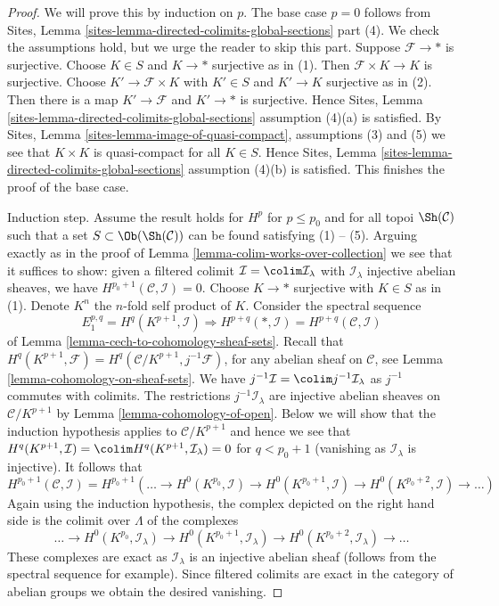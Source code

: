 \begin{proof}
We will prove this by induction on $p$. The base case $p = 0$
follows from
Sites, Lemma \ref{sites-lemma-directed-colimits-global-sections} part (4).
We check the assumptions hold, but we urge the reader to skip this part.
Suppose $\mathcal{F} \to *$ is surjective.
Choose $K \in S$ and $K \to *$ surjective as in (1). Then
$\mathcal{F} \times K \to K$ is surjective. Choose
$K' \to \mathcal{F} \times K$ with $K' \in S$ and $K' \to K$
surjective as in (2).
Then there is a map $K' \to \mathcal{F}$ and $K' \to *$ is surjective.
Hence 
Sites, Lemma \ref{sites-lemma-directed-colimits-global-sections}
assumption (4)(a) is satisfied.
By Sites, Lemma \ref{sites-lemma-image-of-quasi-compact}, assumptions
(3) and (5) we see that $K \times K$ is quasi-compact
for all $K \in S$.
Hence 
Sites, Lemma \ref{sites-lemma-directed-colimits-global-sections}
assumption (4)(b) is satisfied.
This finishes the proof of the base case.

\medskip\noindent
Induction step. Assume the result holds for
$H^p$ for $p \leq p_0$ and for all topoi $\Sh(\mathcal{C})$
such that a set $S \subset \Ob(\Sh(\mathcal{C}))$ can be found
satisfying (1) -- (5). Arguing exactly as in the proof of
Lemma \ref{lemma-colim-works-over-collection}
we see that it suffices to show: given a filtered colimit
$\mathcal{I} = \colim \mathcal{I}_\lambda$ with
$\mathcal{I}_\lambda$ injective abelian sheaves, we have
$H^{p_0 + 1}(\mathcal{C}, \mathcal{I}) = 0$.
Choose $K \to *$ surjective with $K \in S$ as in (1).
Denote $K^n$ the $n$-fold self product of $K$.
Consider the spectral sequence
$$
E_1^{p, q} = H^q(K^{p + 1}, \mathcal{I}) \Rightarrow
H^{p + q}(*, \mathcal{I}) = H^{p + q}(\mathcal{C}, \mathcal{I})
$$
of Lemma \ref{lemma-cech-to-cohomology-sheaf-sets}. Recall that
$H^q(K^{p + 1}, \mathcal{F}) = H^q(\mathcal{C}/K^{p + 1}, j^{-1}\mathcal{F})$,
for any abelian sheaf on $\mathcal{C}$, see
Lemma \ref{lemma-cohomology-on-sheaf-sets}. We have
$j^{-1}\mathcal{I} = \colim j^{-1}\mathcal{I}_\lambda$
as $j^{-1}$ commutes with colimits. The restrictions
$j^{-1}\mathcal{I}_\lambda$ are injective abelian sheaves
on $\mathcal{C}/K^{p + 1}$ by Lemma \ref{lemma-cohomology-of-open}.
Below we will show that the induction hypothesis applies
to $\mathcal{C}/K^{p + 1}$ and hence we see that
$H^q(K^{p + 1}, \mathcal{I}) = \colim H^q(K^{p + 1}, \mathcal{I}_\lambda) = 0$
for $q < p_0 + 1$ (vanishing as $\mathcal{I}_\lambda$ is injective).
It follows that
$$
H^{p_0 + 1}(\mathcal{C}, \mathcal{I}) =
H^{p_0 + 1}\left(\ldots \to
H^0(K^{p_0}, \mathcal{I}) \to
H^0(K^{p_0 + 1}, \mathcal{I}) \to
H^0(K^{p_0 + 2}, \mathcal{I}) \to \ldots\right)
$$
Again using the induction hypothesis, the complex depicted on the right
hand side is the colimit over $\Lambda$ of the complexes
$$
\ldots \to
H^0(K^{p_0}, \mathcal{I}_\lambda) \to
H^0(K^{p_0 + 1}, \mathcal{I}_\lambda) \to
H^0(K^{p_0 + 2}, \mathcal{I}_\lambda) \to \ldots
$$
These complexes are exact as $\mathcal{I}_\lambda$ is an
injective abelian sheaf (follows from the spectral sequence
for example). Since filtered colimits are exact in the category
of abelian groups we obtain the desired vanishing.


\end{proof}
